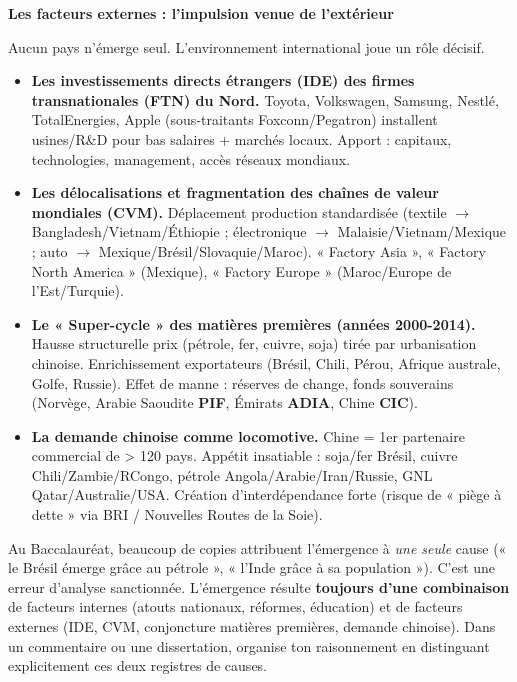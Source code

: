 \documentclass[11pt]{article}
\newcommand{\cle}[1]{{\popxbold\color{popdark}#1}}
\begin{document}
\textbf{Les facteurs externes : l'impulsion venue de l'extérieur}\par

Aucun pays n'émerge seul. L'environnement international joue un rôle décisif.

\begin{itemize}
\item \textbf{Les investissements directs étrangers (IDE) des firmes transnationales (FTN) du Nord.} Toyota, Volkswagen, Samsung, Nestlé, TotalEnergies, Apple (sous-traitants Foxconn/Pegatron) installent usines/R\&D pour bas salaires + marchés locaux. Apport : capitaux, technologies, management, accès réseaux mondiaux.
\item \textbf{Les délocalisations et fragmentation des chaînes de valeur mondiales (CVM).} Déplacement production standardisée (textile $\to$ Bangladesh/Vietnam/Éthiopie ; électronique $\to$ Malaisie/Vietnam/Mexique ; auto $\to$ Mexique/Brésil/Slovaquie/Maroc). « \cle{Factory Asia} », « \cle{Factory North America} » (Mexique), « \cle{Factory Europe} » (Maroc/Europe de l'Est/Turquie).
\item \textbf{Le « Super-cycle » des matières premières (années 2000-2014).} Hausse structurelle prix (pétrole, fer, cuivre, soja) tirée par urbanisation chinoise. Enrichissement exportateurs (Brésil, Chili, Pérou, Afrique australe, Golfe, Russie). \cle{Effet de manne} : réserves de change, fonds souverains (Norvège, Arabie Saoudite \textbf{PIF}, Émirats \textbf{ADIA}, Chine \textbf{CIC}).
\item \textbf{La demande chinoise comme locomotive.} Chine = 1er partenaire commercial de > 120 pays. Appétit insatiable : soja/fer Brésil, cuivre Chili/Zambie/RCongo, pétrole Angola/Arabie/Iran/Russie, GNL Qatar/Australie/USA. Création d'interdépendance forte (risque de « piège à dette » via BRI / Nouvelles Routes de la Soie).
\end{itemize}

\begin{attention}
Au Baccalauréat, beaucoup de copies attribuent l'émergence à \emph{une seule} cause (« le Brésil émerge grâce au pétrole », « l'Inde grâce à sa population »). C'est une erreur d'analyse sanctionnée. L'émergence résulte \textbf{toujours d'une combinaison} de facteurs internes (atouts nationaux, réformes, éducation) et de facteurs externes (IDE, CVM, conjoncture matières premières, demande chinoise). Dans un commentaire ou une dissertation, organise ton raisonnement en distinguant explicitement ces deux registres de causes.
\end{attention}
\end{document}
